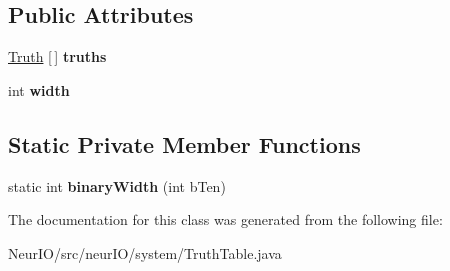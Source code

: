 \subsection*{Public Attributes}
\begin{DoxyCompactItemize}
\item 
\mbox{\label{classneur_i_o_1_1system_1_1_truth_table_aa8cdabf1eb334fc405d50b9249e42ae4}} 
\hyperlink{classneur_i_o_1_1system_1_1_truth}{Truth} \mbox{[}$\,$\mbox{]} {\bfseries truths}
\item 
\mbox{\label{classneur_i_o_1_1system_1_1_truth_table_a71a416200e01a326bad83c9509cca9f1}} 
int {\bfseries width}
\end{DoxyCompactItemize}
\subsection*{Static Private Member Functions}
\begin{DoxyCompactItemize}
\item 
\mbox{\label{classneur_i_o_1_1system_1_1_truth_table_a69909006883a5927d8f58c61c3d544c2}} 
static int {\bfseries binary\+Width} (int b\+Ten)
\end{DoxyCompactItemize}


The documentation for this class was generated from the following file\+:\begin{DoxyCompactItemize}
\item 
Neur\+I\+O/src/neur\+I\+O/system/Truth\+Table.\+java\end{DoxyCompactItemize}
